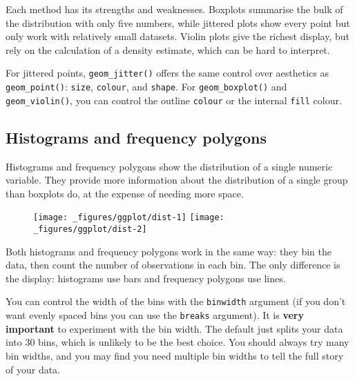 Each method has its strengths and weaknesses. Boxplots summarise the
bulk of the distribution with only five numbers, while jittered plots
show every point but only work with relatively small datasets. Violin
plots give the richest display, but rely on the calculation of a density
estimate, which can be hard to interpret.

For jittered points, \texttt{geom\_jitter()} offers the same control
over aesthetics as \texttt{geom\_point()}: \texttt{size},
\texttt{colour}, and \texttt{shape}. For \texttt{geom\_boxplot()} and
\texttt{geom\_violin()}, you can control the outline \texttt{colour} or
the internal \texttt{fill} colour.

\subsection{Histograms and frequency polygons}\label{sub:distribution}

Histograms and frequency polygons show the distribution of a single
numeric variable. They provide more information about the distribution
of a single group than boxplots do, at the expense of needing more
space.  

\begin{Shaded}
\begin{Highlighting}[]
\StringTok{ }\NormalTok{()}
\StringTok{ }\NormalTok{()}
\end{Highlighting}
\end{Shaded}

\begin{figure}[H]
  \texttt{[image: \_figures/ggplot/dist-1]}%
  \texttt{[image: \_figures/ggplot/dist-2]}
\end{figure}

Both histograms and frequency polygons work in the same way: they bin
the data, then count the number of observations in each bin. The only
difference is the display: histograms use bars and frequency polygons
use lines.

You can control the width of the bins with the \texttt{binwidth}
argument (if you don't want evenly spaced bins you can use the
\texttt{breaks} argument). It is \textbf{very important} to experiment
with the bin width. The default just splits your data into 30 bins,
which is unlikely to be the best choice. You should always try many bin
widths, and you may find you need multiple bin widths to tell the full
story of your data.

